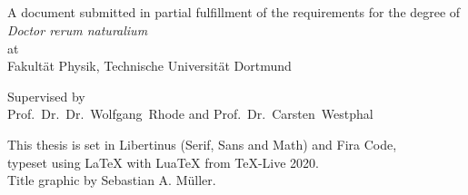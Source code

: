 \begin{titlepage}
  \vspace*{5cm}
  \begin{center}
    {\@title \\[0.5\baselineskip]}
    {\@subtitle\\[0.5\baselineskip]}
    {\@author}\\
    {\@date}\\

    \vspace{11cm}

    {\large%
      A document submitted in partial fulfillment of the requirements for the degree of \\
      \emph{Doctor rerum naturalium} \\
      at \\
      Fakultät Physik, Technische Universität Dortmund
    }

    \vfill
    {\large%
      Supervised by \\
      Prof.~Dr.~Dr.~Wolfgang~Rhode and Prof.~Dr.~Carsten~Westphal
    }%
  \end{center}
\end{titlepage}
\makeatother

\newpage
\thispagestyle{empty}
\vspace*{\fill}
\small\noindent%
This thesis is set in Libertinus (Serif, Sans and Math) and Fira Code,\\
typeset using \LaTeX{} with Lua\TeX{} from \TeX-Live 2020.\\
Title graphic by Sebastian A. Müller.
\newpage
